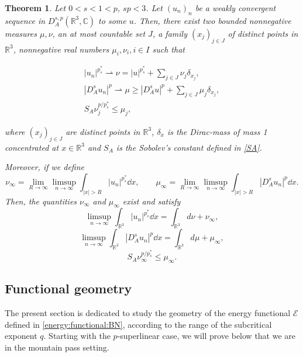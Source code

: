 \documentclass[leqno,11pt]{amsart}
\newcommand{\R}{\mathbb R}
\newcommand{\CC}{\mathbb C}
\newcommand{\cE}{{\mathcal E}}
\numberwithin{equation}{section}
\newtheorem{theorem}{Theorem}[section]
\begin{document}
\begin{theorem}
\label{Our:concentration:compactness}
Let $0<s<1<p$, $ sp< 3$.
Let $(u_{n})_{n}$ be a weakly convergent sequence in $D^{s,p}_A(\R^3,\CC)$ to some $u$.
Then, there exist two bounded nonnegative measures $\mu,\nu$, an at most countable set
$J$, a family $(x_j)_{j\in J}$ of distinct points in
$\R^3$, nonnegative real numbers $\mu_i, \nu_i, i\in I$ such that

\begin{gather}
|u_{n}|^{p^*_s}\rightharpoonup\nu=|u|^{p^*_s}+ \sum_{j\in J}\nu_{j}\delta_{x_{j}},\label{u}\\
|D^s_A u_{n}|^{p}\rightharpoonup\mu\ge|D^s_A u|^{p}+\sum_{j\in J}\mu_{j}\delta_{x_{j}},\label{DsA}\\
S_A\nu_{j}^{p/p^*_s}\le \mu_{j},\label{relation:nu:mu:atomic}
\end{gather}

where $(x_j)_{j\in J}$ are distinct points in $\R^3$, $\delta_{x}$ is the Dirac-mass of mass 1 concentrated at
$x\in\R^3$ and $S_A$ is the Sobolev's constant defined in \eqref{SA}.

Moreover, if we define
\begin{equation}\label{def:mu:nu:inf}
\nu_\infty=\lim_{R\to\infty} \limsup_{n\to\infty} \int_{|x|>R} |u_n|^{p^*_s} \dd x,\qquad
\mu_\infty=\lim_{R\to\infty} \limsup_{n\to\infty} \int_{|x|>R} |D^s_A u_n|^{p} \dd x.
\end{equation}
Then, the quantities $\nu_\infty$ and $\mu_\infty$ exist and satisfy
\begin{equation}\label{un:crit:inf}
\limsup_{n\to\infty} \int_{\R^3} |u_n|^{p^*_s} \dd x=\int_{\R^3} d\nu +\nu_\infty,
\end{equation}
\begin{equation}\label{Dspa:inf}
\limsup_{n\to\infty} \int_{\R^3} |D^s_A u_n|^{p} \dd x=\int_{\R^3} d\mu +\mu_\infty,
\end{equation}
\begin{equation}\label{relation:nu:mu:infty}
S_A\nu_{\infty}^{p/p^*_s}\le \mu_\infty.
\end{equation}
\end{theorem}




\subsection{Functional geometry}

The present section is dedicated to study the geometry of the energy functional $\cE$ defined in \eqref{energy:functional:BN}, according to the range of the subcritical exponent $q$. Starting with the $p$-superlinear case, we will prove below that we are in the mountain pass setting.
\end{document}
